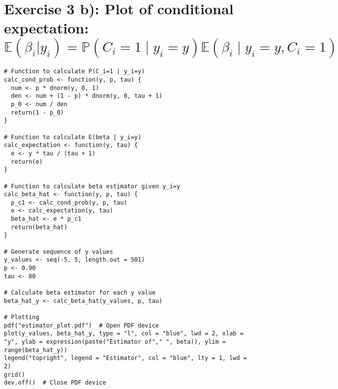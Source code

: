 \section*{Exercise 3 b): Plot of conditional expectation: $\mathbb{E}(\beta_i | y_i) = \mathbb{P}\left(C_i=1 \mid y_i=y\right) \mathbb{E}\left(\beta_i \mid y_i=y, C_i=1\right)$}
\begin{tcolorbox}[colback=white!95!black,colframe=white!50!black]
\begin{lstlisting}[caption={Exercise 3b}, label={lst:beta_hat_estimate}]
# Function to calculate P(C_i=1 | y_i=y)
calc_cond_prob <- function(y, p, tau) {
  num <- p * dnorm(y, 0, 1)
  den <- num + (1 - p) * dnorm(y, 0, tau + 1)
  p_0 <- num / den
  return(1 - p_0)
}

# Function to calculate E(beta | y_i=y)
calc_expectation <- function(y, tau) {
  e <- y * tau / (tau + 1)
  return(e)
}

# Function to calculate beta estimator given y_i=y
calc_beta_hat <- function(y, p, tau) {
  p_c1 <- calc_cond_prob(y, p, tau)
  e <- calc_expectation(y, tau)
  beta_hat <- e * p_c1
  return(beta_hat)
}

# Generate sequence of y values
y_values <- seq(-5, 5, length.out = 501)
p <- 0.90
tau <- 80

# Calculate beta estimator for each y value
beta_hat_y <- calc_beta_hat(y_values, p, tau)

# Plotting
pdf("estimator_plot.pdf")  # Open PDF device
plot(y_values, beta_hat_y, type = "l", col = "blue", lwd = 2, xlab = "y", ylab = expression(paste("Estimator of"," ", beta)), ylim = range(beta_hat_y))
legend("topright", legend = "Estimator", col = "blue", lty = 1, lwd = 2)
grid()
dev.off()  # Close PDF device
\end{lstlisting}
\end{tcolorbox}
\vspace{10mm}
